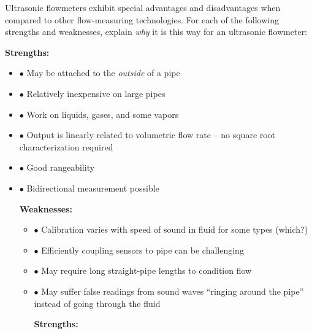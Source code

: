 

Ultrasonic flowmeters exhibit special advantages and disadvantages when compared to other flow-measuring technologies.  For each of the following strengths and weaknesses, explain {\it why} it is this way for an ultrasonic flowmeter:

\vskip 10pt

{\bf Strengths:}

\begin{itemize}
\item{$\bullet$} May be attached to the {\it outside} of a pipe
\item{$\bullet$} Relatively inexpensive on large pipes
\item{$\bullet$} Work on liquids, gases, and some vapors
\item{$\bullet$} Output is linearly related to volumetric flow rate -- no square root characterization required
\item{$\bullet$} Good rangeability
\item{$\bullet$} Bidirectional measurement possible
\medskip

\vskip 10pt

{\bf Weaknesses:}

\begin{itemize}
\item{$\bullet$} Calibration varies with speed of sound in fluid for some types (which?)
\item{$\bullet$} Efficiently coupling sensors to pipe can be challenging
\item{$\bullet$} May require long straight-pipe lengths to condition flow
\item{$\bullet$} May suffer false readings from sound waves ``ringing around the pipe'' instead of going through the fluid
\medskip














{\bf Strengths:}


\end{itemize}
\end{itemize}
